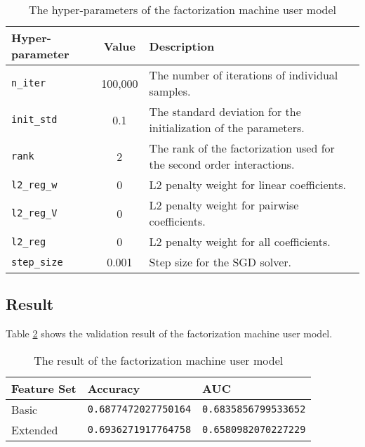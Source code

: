         \begin{table}[hpbt]
        \centering
        \begin{tabular}{lcl}
            \hline
            Hyper-parameter & Value & Description \\
            \hline
            \verb|n_iter|    & 100,000 & The number of iterations of individual samples. \\
            \verb|init_std|  & 0.1 & The standard deviation for the initialization of the parameters. \\
            \verb|rank|      & 2 & The rank of the factorization used for the second order interactions. \\
            \verb|l2_reg_w|  & 0 & L2 penalty weight for linear coefficients. \\
            \verb|l2_reg_V|  & 0 & L2 penalty weight for pairwise coefficients. \\
            \verb|l2_reg|    & 0 & L2 penalty weight for all coefficients. \\
            \verb|step_size| & 0.001 & Step size for the SGD solver. \\
            \hline
        \end{tabular}
        \caption{The hyper-parameters of the factorization machine user model}
        \label{table:fm param}
        \end{table}

    \subsection{Result}

        Table \ref{table:fm result} shows the validation result of the factorization machine user model.

        \begin{table}[hpbt]
        \centering
        \begin{tabular}{lll}
            \hline
            Feature Set & Accuracy & AUC \\
            \hline
            Basic    & \verb|0.6877472027750164| & \verb|0.6835856799533652| \\
            Extended & \verb|0.6936271917764758| & \verb|0.6580982070227229| \\
            \hline
        \end{tabular}
        \caption{The result of the factorization machine user model}
        \label{table:fm result}
        \end{table}

